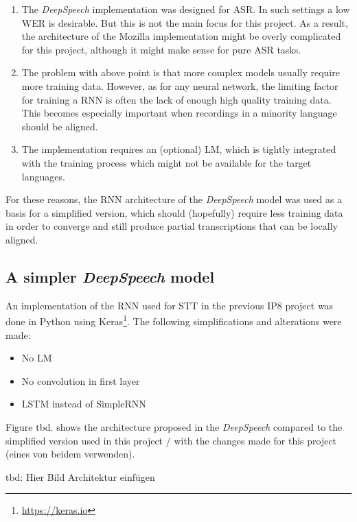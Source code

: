 \begin{enumerate}
	\item The \textit{DeepSpeech} implementation was designed for \ac{ASR}. In such settings a low \ac{WER} is desirable. But this is not the main focus for this project. As a result, the architecture of the Mozilla implementation might be overly complicated for this project, although it might make sense for pure \ac{ASR} tasks. 
	\item The problem with above point is that more complex models usually require more training data. However, as for any neural network, the limiting factor for training a \ac{RNN} is often the lack of enough high quality training data. This becomes especially important when recordings in a minority language should be aligned. 
	\item The implementation requires an (optional) \ac{LM}, which is tightly integrated with the training process which might not be available for the target languages.
\end{enumerate}

For these reasons, the \ac{RNN} architecture of the \textit{DeepSpeech} model was used as a basis for a simplified version, which should (hopefully) require less training data in order to converge and still produce partial transcriptions that can be locally aligned.

\subsection{A simpler \textit{DeepSpeech} model}

An implementation of the \ac{RNN} used for \ac{STT} in the previous IP8 project was done in Python using Keras\footnote{\url{https://keras.io}}. The following simplifications and alterations were made:

\begin{itemize}
	\item No \ac{LM} 
	\item No convolution in first layer
	\item LSTM instead of SimpleRNN
\end{itemize}

Figure tbd. shows the architecture proposed in the \textit{DeepSpeech} compared to the simplified version used in this project / with the changes made for this project (eines von beidem verwenden).

tbd: Hier Bild Architektur einfügen

